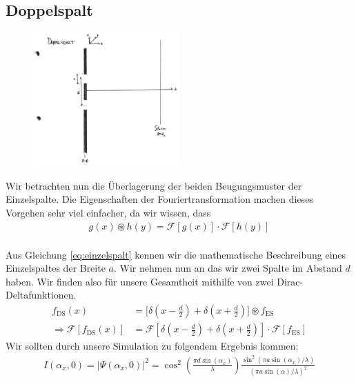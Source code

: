 \documentclass[a4paper]{article}
\newcommand{\ff}[1]{\mathscr{F}\left[#1\right]}
\begin{document}
\subsection{Doppelspalt}
\begin{figure}[!htb]
\centering

\includegraphics[width=0.5\textwidth]{doppelspalt.pdf}
\end{figure}
Wir betrachten nun die Überlagerung der beiden Beugungsmuster der Einzelspalte. Die Eigenschaften der Fouriertransformation machen dieses Vorgehen sehr viel einfacher, da wir wissen, dass
\begin{align}
g(x) \circledast h(y) = \mathscr{F}[g(x)] \cdot \mathscr{F}[h(y)] \\
\end{align}

Aus Gleichung \ref{eq:einzelspalt} kennen wir die mathematische Beschreibung eines Einzelspaltes der Breite $a$. Wir nehmen nun an das wir zwei Spalte im Abstand $d$ haben. Wir finden also für unsere Gesamtheit mithilfe von zwei Dirac-Deltafunktionen.
\begin{align}
f_{\text{DS}}(x) &= \Bigg[ \delta\left(x-\frac{d}{2}\right) + \delta\left(x+\frac{d}{2}\right) \Bigg]  \circledast f_\text{ES} \\
\Rightarrow \ff{f_{\text{DS}}(x) } &= \ff{ \delta\left(x-\frac{d}{2}\right) + \delta\left(x+\frac{d}{2}\right)  } \cdot \ff{f_\text{ES}}
\end{align}
Wir sollten durch unsere Simulation zu folgendem Ergebnis kommen:
\begin{align}
I(\alpha_x,0) = |\Psi(\alpha_x,0)|^2 =  \cos^2 \left(\frac{\pi d \sin(\alpha_x)}{\lambda}\right) \frac{\sin^2(\pi a \sin(\alpha_x)/\lambda)}{(\pi a \sin(\alpha)/\lambda)^2}
\end{align}
\end{document}
